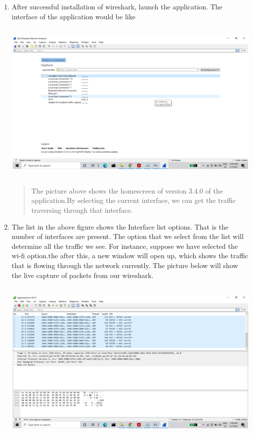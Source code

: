 \documentclass[12pt, a4paper]{report}
\begin{document}
\begin{enumerate}
\def\labelenumi{\arabic{enumi})}
\item
  After successful installation of wireshark, launch the application.
  The interface of the application would be like
  \begin{center}\includegraphics[width=5.56771in,height=3.13530in]{image6.png}\end{center}
  


\begin{quote}
The picture above shows the homescreen of version 3.4.0 of the
application.By selecting the current interface, we can get the traffic
traversing through that interface.
\end{quote}


\def\labelenumi{\arabic{enumi})}
\item
  The list in the above figure shows the Interface list options. That is
  the number of interfaces are present. The option that we select from
  the list will determine all the traffic we see. For instance, suppose
  we have selected the wi-fi option.the after this, a new window will
  open up, which shows the traffic that is flowing through the network
  currently. The picture below will show the live capture of packets
  from our wireshark.


\includegraphics[width=5.60628in,height=3.16538in]{image3.png}



\end{enumerate}
\end{document}
